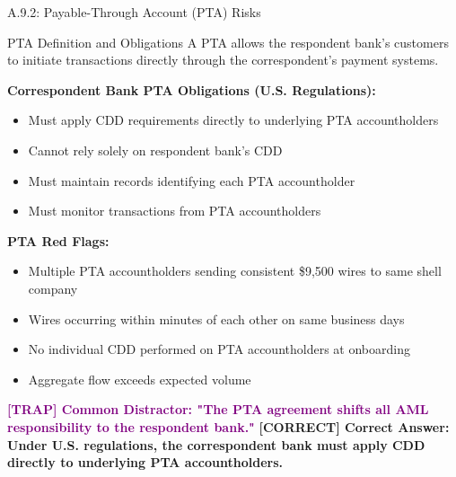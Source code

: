\documentclass[11pt,a4paper]{beamer}
\newcommand{\trap}[1]{\textcolor{purple}{\textbf{[TRAP] #1}}}
\newcommand{\correct}[1]{\textcolor{green!50!black}{\textbf{[CORRECT] #1}}}
\begin{document}
	\begin{frame}{A.9.2: Payable-Through Account (PTA) Risks}
		\begin{block}{PTA Definition and Obligations}
			A PTA allows the respondent bank's customers to initiate transactions directly through the correspondent's payment systems.
		\end{block}
		\textbf{Correspondent Bank PTA Obligations (U.S. Regulations):}
		\begin{itemize}
			\item Must apply CDD requirements directly to underlying PTA accountholders
			\item Cannot rely solely on respondent bank's CDD
			\item Must maintain records identifying each PTA accountholder
			\item Must monitor transactions from PTA accountholders
		\end{itemize}
		\textbf{PTA Red Flags:}
		\begin{itemize}
			\item Multiple PTA accountholders sending consistent \$9,500 wires to same shell company
			\item Wires occurring within minutes of each other on same business days
			\item No individual CDD performed on PTA accountholders at onboarding
			\item Aggregate flow exceeds expected volume
		\end{itemize}
		
		\trap{Common Distractor: "The PTA agreement shifts all AML responsibility to the respondent bank."}
		\correct{Correct Answer: Under U.S. regulations, the correspondent bank must apply CDD directly to underlying PTA accountholders.}
	\end{frame}
	
	
\end{document}
